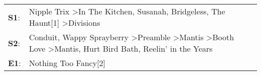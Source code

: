 \begin{supertabular}{p{0.03\textwidth}p{0.92\textwidth}}
 \textbf{S1}:  &                                                                                                            Nipple Trix\textsuperscript{} \textgreater \enspace In The Kitchen\textsuperscript{}, \enspace Susanah\textsuperscript{}, \enspace Bridgeless\textsuperscript{}, \enspace The Haunt[1]\textsuperscript{} \textgreater \enspace Divisions\textsuperscript{}  \enspace  \\
 \textbf{S2}:  &  Conduit\textsuperscript{}, \enspace Wappy Sprayberry\textsuperscript{} \textgreater \enspace Preamble\textsuperscript{} \textgreater \enspace Mantis\textsuperscript{} \textgreater \enspace Booth Love\textsuperscript{} \textgreater \enspace Mantis\textsuperscript{}, \enspace Hurt Bird Bath\textsuperscript{}, \enspace Reelin' in the Years\textsuperscript{}  \enspace  \\
 \textbf{E1}:  &                                                                                                                                                                                                                                                                                                                                Nothing Too Fancy[2]\textsuperscript{}  \enspace  \\
\end{supertabular}
